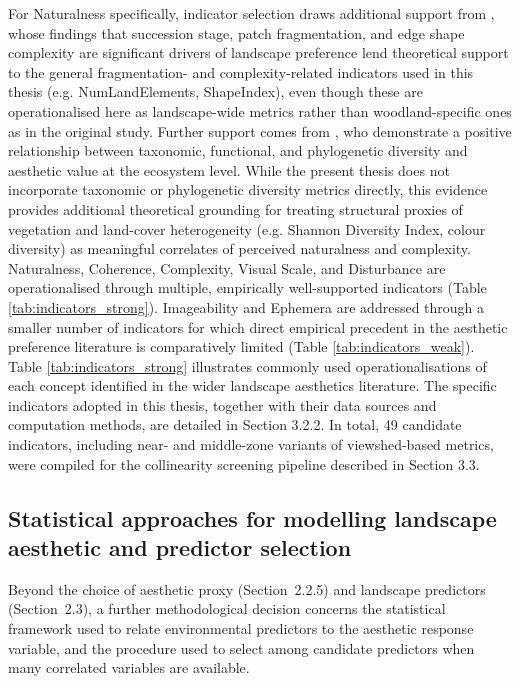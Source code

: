 \documentclass[hidelinks, 11pt]{article}
\begin{document}
For Naturalness specifically, indicator selection draws additional support from \citet{ode_indicators_2009}, whose findings that succession stage, patch fragmentation, and edge shape complexity are significant drivers of landscape preference lend theoretical support to the general fragmentation- and complexity-related indicators used in this thesis (e.g. NumLandElements, ShapeIndex), even though these are operationalised here as landscape-wide metrics rather than woodland-specific ones as in the original study. Further support comes from \citet{tribot_integrating_2018}, who demonstrate a positive relationship between taxonomic, functional, and phylogenetic diversity and aesthetic value at the ecosystem level. While the present thesis does not incorporate taxonomic or phylogenetic diversity metrics directly, this evidence provides additional theoretical grounding for treating structural proxies of vegetation and land-cover heterogeneity (e.g. Shannon Diversity Index, colour diversity) as meaningful correlates of perceived naturalness and complexity.
\\
Naturalness, Coherence, Complexity, Visual Scale, and Disturbance are operationalised through multiple, empirically well-supported indicators (Table \ref{tab:indicators_strong}). Imageability and Ephemera are addressed through a smaller number of indicators for which direct empirical precedent in the aesthetic preference literature is comparatively limited (Table \ref{tab:indicators_weak}). Table \ref{tab:indicators_strong} illustrates commonly used operationalisations of each concept identified in the wider landscape aesthetics literature. The specific indicators adopted in this thesis, together with their data sources and computation methods, are detailed in Section 3.2.2. In total, 49 candidate indicators, including near- and middle-zone variants of viewshed-based metrics, were compiled for the collinearity screening pipeline described in Section 3.3.



\subsection{Statistical approaches for modelling landscape aesthetic and predictor selection}\label{sec:ModelSOTA}

Beyond the choice of aesthetic proxy (Section~2.2.5) and landscape predictors (Section~2.3), a further methodological decision concerns the statistical framework used to relate environmental predictors to the aesthetic response variable, and the procedure used to select among candidate predictors when many correlated variables are available.
\end{document}
